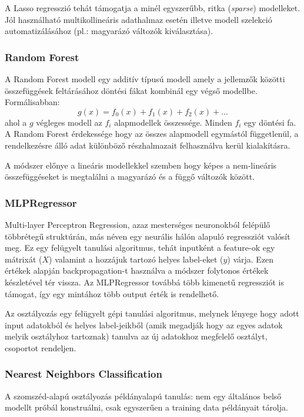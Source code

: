A Lasso regresszió tehát támogatja a minél egyszerűbb, ritka (\textit{sparse}) modelleket. Jól használható multikollineáris adathalmaz esetén illetve modell szelekció automatizálásához (pl.: magyarázó változók kiválasztása).



\subsubsection{Random Forest }
A Random Forest modell egy additív típusú modell amely a jellemzők közötti összefüggések feltárásához döntési fákat kombinál egy végső modellbe. Formálisabban:
$$ g(x) = f_0(x) + f_1(x) + f_2(x) + \dots$$
ahol a $g$ végleges modell az $f_i$ alapmodellek összessége. Minden $f_i$ egy döntési fa. A Random Forest érdekessége hogy az összes alapmodell egymástól függetlenül, a rendelkezésre álló adat különböző részhalmazait felhasználva kerül kialakításra.

A módszer előnye a lineáris modellekkel szemben hogy képes a nem-lineáris összefüggéseket is megtalálni a magyarázó és a függő változók között.



\subsubsection{MLPRegressor} \label{ssec:mlpregressor}
Multi-layer Perceptron Regression, azaz mesterséges neuronokból felépülő többrétegű struktúrán, más néven egy neurális hálón alapuló regressziót valósít meg. Ez egy felügyelt tanulási algoritmus, tehát inputként a feature-ok egy mátrixát ($X$) valamint a hozzájuk tartozó helyes label-eket ($y$) várja. Ezen értékek alapján backpropagation-t használva a módszer folytonos értékek készletével tér vissza. Az MLPRegressor továbbá több kimenetű regressziót is támogat, így egy mintához több output érték is rendelhető.


Az osztályozás egy felügyelt gépi tanulási algoritmus, melynek lényege hogy adott input adatokból és helyes label-jeikből (amik megadják hogy az egyes adatok melyik osztályhoz tartoznak) tanulva az új adatokhoz megfelelő osztályt, csoportot rendeljen. 
\subsubsection{Nearest Neighbors Classification}

A szomszéd-alapú osztályozás példányalapú tanulás: nem egy általános belső modellt próbál konstruálni, csak egyszerűen a training data példányait tárolja.

